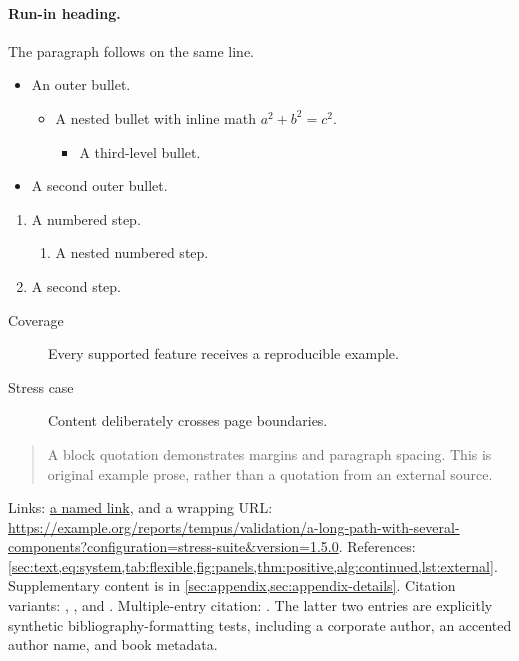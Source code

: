 \documentclass[algorithms,listings]{tempusreport}
\begin{document}
\paragraph{Run-in heading.} The paragraph follows on the same line.
\begin{itemize}
\item An outer bullet.
  \begin{itemize}\item A nested bullet with inline math $a^2+b^2=c^2$.
    \begin{itemize}\item A third-level bullet.\end{itemize}
  \end{itemize}
\item A second outer bullet.
\end{itemize}
\begin{enumerate}
\item A numbered step.\begin{enumerate}\item A nested numbered step.\end{enumerate}
\item A second step.
\end{enumerate}
\begin{description}
\item[Coverage] Every supported feature receives a reproducible example.
\item[Stress case] Content deliberately crosses page boundaries.
\end{description}
\begin{quote}
A block quotation demonstrates margins and paragraph spacing. This is
original example prose, rather than a quotation from an external source.
\end{quote}
Links: \href{https://example.org}{a named link}, and a wrapping URL:
\url{https://example.org/reports/tempus/validation/a-long-path-with-several-components?configuration=stress-suite&version=1.5.0}.
References: \cref{sec:text,eq:system,tab:flexible,fig:panels,thm:positive,alg:continued,lst:external}.
Supplementary content is in \cref{sec:appendix,sec:appendix-details}.
Citation variants: \citeauthor{vaswani2017attention},
\citeyearpar{vaswani2017attention}, and
\citep[see][Section 3]{vaswani2017attention}.
Multiple-entry citation: \citep{vaswani2017attention,tempus2026fixture,example2026book}.
The latter two entries are explicitly synthetic bibliography-formatting tests,
including a corporate author, an accented author name, and book metadata.
\end{document}
